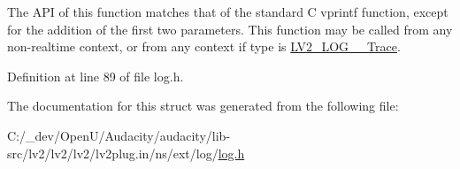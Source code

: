 The A\+PI of this function matches that of the standard C vprintf function, except for the addition of the first two parameters. This function may be called from any non-\/realtime context, or from any context if {\ttfamily type} is \hyperlink{lv2_2lv2_2lv2_2lv2plug_8in_2ns_2ext_2log_2log_8h_aada17d944b0bf4097587300ca6051b16}{L\+V2\+\_\+\+L\+O\+G\+\_\+\+\_\+\+Trace}. 

Definition at line 89 of file log.\+h.



The documentation for this struct was generated from the following file\+:\begin{DoxyCompactItemize}
\item 
C\+:/\+\_\+dev/\+Open\+U/\+Audacity/audacity/lib-\/src/lv2/lv2/lv2/lv2plug.\+in/ns/ext/log/\hyperlink{lv2_2lv2_2lv2_2lv2plug_8in_2ns_2ext_2log_2log_8h}{log.\+h}\end{DoxyCompactItemize}
